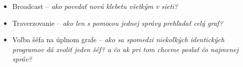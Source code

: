 


\begin{itemize}

    \item Broadcast -- \textit{ako povedať novú klebetu všetkým v sieti?}
    \item Traverzovanie -- \textit{ako len s pomocou jednej správy prehľadať celý graf?}
    \item Voľba šéfa na úplnom grafe -- \textit{ako sa spomedzi niekoľkých identických programov
    dá zvoliť jeden šéf? a čo ak pri tom chceme poslať čo najmenej správ?}

\end{itemize}
    







